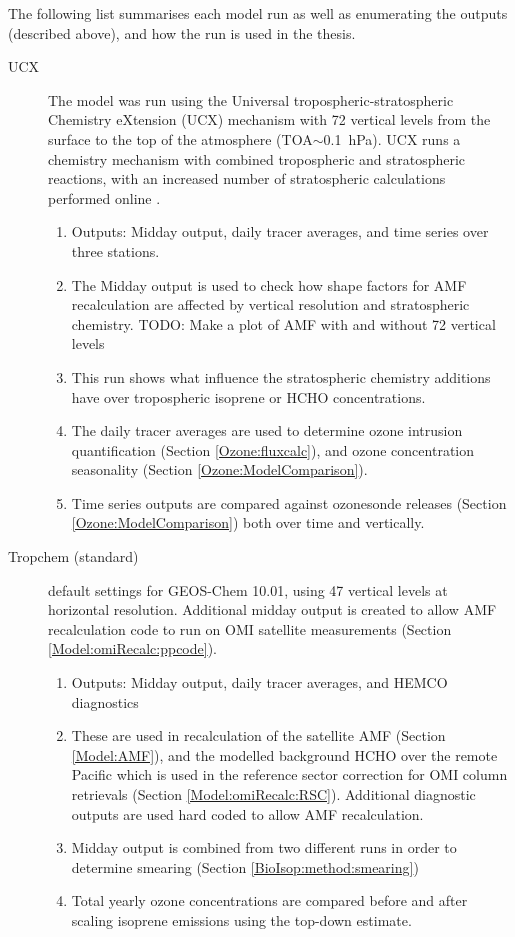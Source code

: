       The following list summarises each model run as well as enumerating the outputs (described above), and how the run is used in the thesis.
      \begin{description}
        \item[UCX]%
          The model was run using the Universal tropospheric-stratospheric Chemistry eXtension (UCX) mechanism with 72 vertical levels from the surface to the top of the atmosphere (TOA$\sim$0.1~hPa).
          UCX runs a chemistry mechanism with combined tropospheric and stratospheric reactions, with an increased number of stratospheric calculations performed online \parencite{Eastham2014}.
          \begin{enumerate}
            \item Outputs: Midday output, daily tracer averages, and time series over three stations.
            \item The Midday output is used to check how shape factors for AMF recalculation are affected by vertical resolution and stratospheric chemistry. 
            TODO: Make a plot of AMF with and without 72 vertical levels
            \item This run shows what influence the stratospheric chemistry additions have over tropospheric isoprene or HCHO concentrations.
            \item The daily tracer averages are used to determine ozone intrusion quantification (Section \ref{Ozone:fluxcalc}), and ozone concentration seasonality (Section \ref{Ozone:ModelComparison}).
            \item Time series outputs are compared against ozonesonde releases (Section \ref{Ozone:ModelComparison}) both over time and vertically.
          \end{enumerate}
        
        \item [Tropchem (standard)]%
          default settings for GEOS-Chem 10.01, using 47 vertical levels at \lowhr horizontal resolution.
          Additional midday output is created to allow AMF recalculation code to run on OMI satellite measurements (Section \ref{Model:omiRecalc:ppcode}).
          \begin{enumerate}
            \item Outputs: Midday output, daily tracer averages, and HEMCO diagnostics
            \item These are used in recalculation of the satellite AMF (Section \ref{Model:AMF}), and the modelled background HCHO over the remote Pacific which is used in the reference sector correction for OMI column retrievals (Section \ref{Model:omiRecalc:RSC}).
              Additional diagnostic outputs are used hard coded to allow AMF recalculation.
            \item Midday output is combined from two different runs in order to determine smearing (Section \ref{BioIsop:method:smearing})
            \item Total yearly ozone concentrations are compared before and after scaling isoprene emissions using the top-down estimate.
          \end{enumerate}
        

\end{description}
